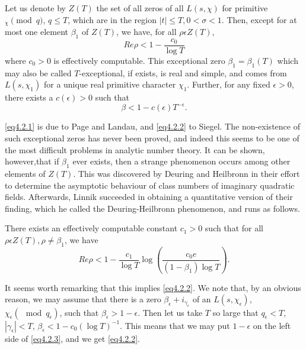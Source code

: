 Let us denote by $Z(T)$ the set of all zeros of all $L(s, \chi)$ for
primitive $_\chi \pmod{q}$, $q \leq T$, which are in the region $| t |
\leq T, 0 < \sigma < 1$. Then, except for at most one element $\beta_1$ of
$Z(T)$, we have, for all $\rho \epsilon  Z(T)$, 
\begin{equation*}
  Re \rho < 1 - \frac{c_0}{\log T} \tag{4.2.1}\label{eq4.2.1}
\end{equation*}
where $c_0 > 0$ is effectively computable. This exceptional zero
$\beta_1 = \beta_1 (T)$ which may also be called $T$-exceptional, if
exists,  is real and simple, and comes from  $L(s, \chi_1)$ for a
unique real primitive character $\chi_1$. Further, for any fixed
$\epsilon  > 0$, there exists a $c(\epsilon ) > 0$ such that  
\begin{equation*}
  \beta < 1 - c(\epsilon  ) T^{- \epsilon }. \tag{4.2.2}\label{eq4.2.2}
\end{equation*}

\eqref{eq4.2.1}  is due to Page and Landau, and \eqref{eq4.2.2} to Siegel. The
non-existence of such exceptional zeros has never  been proved, and
indeed this seems to be one of the most difficult problems in analytic
number theory. It can be shown, however,\pageoriginale that if $\beta_1$ ever
exists, then a strange phenomenon occurs among other elements of
$Z(T)$. This was discovered by Deuring and Heilbronn in their effort
to determine the asymptotic behaviour of class numbers of imaginary
quadratic fields. Afterwards, Linnik succeeded in obtaining a
quantitative version of their finding, which he called the
Deuring-Heilbronn phenomenon, and runs as follows. 

There exists an effectively computable constant $c_1 > 0$ such that
for all $ \rho \epsilon  Z(T), \rho \neq \beta_1$, we have 
\begin{equation*}
  Re \rho < 1 - \frac{c_1}{\log T} \log \left(\frac{c_0e}{(1-\beta_1 ) \log
    T}\right). \tag{4.2.3} \label{eq4.2.3}
\end{equation*}

It seems worth remarking that this implies \eqref{eq4.2.2}. We note that, by
an obvious reason, we may assume that there is a zero $\beta_
\epsilon  + i_{\gamma_ \epsilon }$ of an $L(s, \chi_
\epsilon )$, $\chi_ \epsilon  (\mod q_ \epsilon )$, such that
$\beta_ \epsilon  > 1 - \epsilon $. Then let us take $T$ so large
that $ q_ \epsilon  < T$, $| \gamma_ \epsilon  | < T$, $\beta_
\epsilon  < 1 - c_0 (\log T)^{-1}$. This means that we may put $1-
\epsilon $ on the left side of \eqref{eq4.2.3},  and we get
\eqref{eq4.2.2}.  

